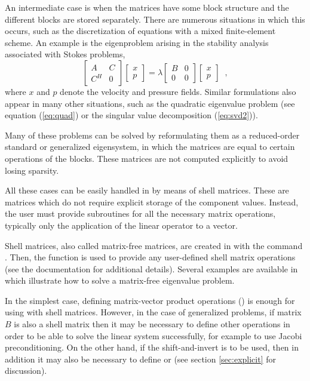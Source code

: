 	An intermediate case is when the matrices have some block structure and the different blocks are stored separately. There are numerous situations in which this occurs, such as the discretization of equations with a mixed finite-element scheme. An example is the eigenproblem arising in the stability analysis associated with Stokes problems,
\begin{equation}
\left[\begin{array}{cc}A & C\\C^H & 0\end{array}\right]\left[\begin{array}{c}x\\p\end{array}\right]
=\lambda\left[\begin{array}{cc}B & 0\\0 & 0\end{array}\right]\left[\begin{array}{c}x\\p\end{array}\right]\;\;,
\end{equation}
where $x$ and $p$ denote the velocity and pressure fields. Similar formulations also appear in many other situations, such as the quadratic eigenvalue problem (see equation (\ref{eq:quad}) or the singular value decomposition (\ref{eq:svd2})).

	Many of these problems can be solved by reformulating them as a reduced-order standard or generalized eigensystem, in which the matrices are equal to certain operations of the blocks. These matrices are not computed explicitly to avoid losing sparsity.

	All these cases can be easily handled in \slepc by means of shell matrices. These are matrices which do not require explicit storage of the component values. Instead, the user must provide subroutines for all the necessary matrix operations, typically only the application of the linear operator to a vector. 

	Shell matrices, also called matrix-free matrices, are created in \petsc{} with the command . Then, the function  is used to provide any user-defined shell matrix operations (see the \petsc{} documentation for additional details). Several examples are available in \slepc which illustrate how to solve a matrix-free eigenvalue problem.

	In the simplest case, defining matrix-vector product operations () is enough for using  with shell matrices. However, in the case of generalized problems, if matrix $B$ is also a shell matrix then it may be necessary to define other operations in order to be able to solve the linear system successfully, for example  to use Jacobi preconditioning. On the other hand, if the shift-and-invert  is to be used, then in addition it may also be necessary to define  or  (see section \ref{sec:explicit} for discussion).

